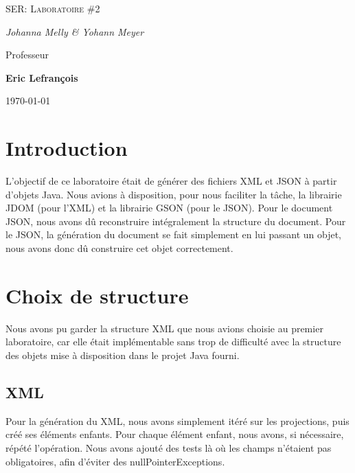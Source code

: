 \documentclass[a4paper]{article} %
\begin{document}
\renewcommand{\labelitemi}{$\bullet$}
\renewcommand{\labelitemii}{$\cdot$}
\renewcommand{\labelitemiii}{$\diamond$}
\renewcommand{\labelitemiv}{$\ast$}

\begin{titlepage}
	\centering
	
	{\scshape\LARGE \color{amethyst} SER: Laboratoire \#2 \\  \par}
	
	\vspace{1cm}
	
	{\Large\itshape Johanna Melly \& Yohann Meyer\par}
	
	\vfill
	Professeur\par
	\textbf{Eric Lefrançois} \par%
	\vspace{1cm}
	
	\vfill

	{\large \today\par}
	
\end{titlepage}

\tableofcontents
\pagebreak
\section{Introduction}
L'objectif de ce laboratoire était de générer des fichiers XML et JSON à partir d'objets Java. Nous avions à disposition, pour nous faciliter la tâche, la librairie JDOM (pour l'XML) et la librairie GSON (pour le JSON). Pour le document JSON, nous avons dû reconstruire intégralement la structure du document. Pour le JSON, la génération du document se fait simplement en lui passant un objet, nous avons donc dû construire cet objet correctement.
\section{Choix de structure}
Nous avons pu garder la structure XML que nous avions choisie au premier laboratoire, car elle était implémentable sans trop de difficulté avec la structure des objets mise à disposition dans le projet Java fourni.
\subsection{XML}
Pour la génération du XML, nous avons simplement itéré sur les projections, puis créé ses éléments enfants. Pour chaque élément enfant, nous avons, si nécessaire, répété l'opération. Nous avons ajouté des tests là où les champs n'étaient pas obligatoires, afin d'éviter des nullPointerExceptions.
\end{document}

